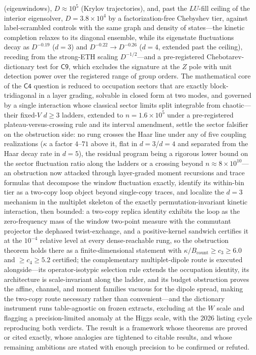 \documentclass[11pt,a4paper]{article}
\theoremstyle{plain}
\theoremstyle{definition}
\theoremstyle{remark}
\begin{document}
(eigenwindows), $D\approx10^{5}$ (Krylov trajectories), and, past the $LU$-fill ceiling of the
interior eigensolver, $D=3.8\times10^{4}$ by a factorization-free Chebyshev tier, against
label-scrambled controls
with the same graph and density of states---the kinetic completion relaxes to its diagonal
ensemble, while its eigenstate fluctuations decay as $D^{-0.19}$ ($d=3$) and
$D^{-0.22}\to D^{-0.26}$ ($d=4$, extended past the ceiling), receding from the strong-ETH
scaling $D^{-1/2}$---and a pre-registered Chebotarev-dictionary test for $\mathsf{C9}$, which
excludes the signature at the $Z$ pole with unit detection power over the registered range of
group orders. The mathematical core of the $\mathsf{C4}$ question is reduced to occupation
sectors that are exactly block-tridiagonal in a layer grading, solvable in closed form at two
modes, and governed by a single interaction whose classical sector limits split integrable
from chaotic---their fixed-$V$ $d\ge3$ ladders, extended to $n=1.6\times10^{5}$ under a
pre-registered plateau-versus-crossing rule and its interval amendment, settle the
sector falsifier on the obstruction side: no rung crosses the Haar line under any of
five coupling realizations ($\kappa$ a factor $4$--$71$ above it, flat in $d=3$/$d=4$
and separated from the Haar decay rate in $d=5$), the residual program being a
rigorous lower bound on the sector fluctuation ratio along the ladders or a crossing
beyond $n\approx8\times10^{10}$---an obstruction now attacked through layer-graded
moment recursions and trace formulas that decompose the window fluctuation exactly,
identify its within-bin tier as a two-copy loop object beyond single-copy traces, and
localize the $d=3$ mechanism in the multiplet skeleton of the exactly
permutation-invariant kinetic interaction, then bounded: a two-copy replica identity
exhibits the loop as the zero-frequency mass of the window two-point measure with the
commutant projector the dephased twist-exchange, and a positive-kernel sandwich
certifies it at the $10^{-4}$ relative level at every dense-reachable rung, so the
obstruction theorem holds there as a finite-dimensional statement with
$\kappa/B_{\mathrm{count}}\ge c_{3}\ge6.0$ and $\ge c_{4}\ge5.2$ certified;
the complementary multiplet-dipole route is executed alongside---its
operator-isotypic selection rule extends the occupation identity, its
architecture is scale-invariant along the ladder, and its budget
obstruction proves the affine, channel, and moment families vacuous for
the dipole spread, making the two-copy route necessary rather than
convenient---and the
dictionary instrument runs table-agnostic on frozen extracts, excluding
at the $W$ scale and flagging a precision-limited anomaly at the Higgs scale, with
the 2026 listing cycle reproducing both verdicts. The result is a
framework whose theorems are proved or cited exactly, whose
analogies are tightened to citable results, and whose remaining ambitions are stated with
enough precision to be confirmed or refuted.
\end{document}
